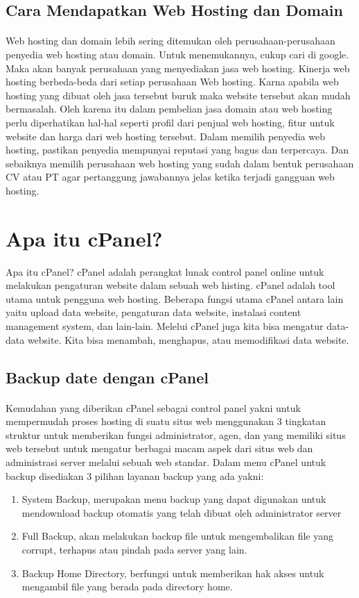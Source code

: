 \documentclass[12pt, a4paper]{article}
\begin{document}
\subsection{Cara Mendapatkan Web Hosting dan Domain}
\paragraph{}Web hosting dan domain lebih sering ditemukan oleh perusahaan-perusahaan penyedia web hosting atau domain. Untuk menemukannya, cukup cari di google. Maka akan banyak perusahaan yang menyediakan jasa web hosting. Kinerja web hosting berbeda-beda dari setiap perusahaan Web hosting. Karna apabila web hosting yang dibuat oleh jasa tersebut buruk maka website tersebut akan mudah bermasalah. Oleh karena itu dalam pembelian jasa domain atau web hosting perlu diperhatikan hal-hal seperti profil dari penjual web hosting, fitur untuk website dan harga dari web hosting tersebut. Dalam memilih penyedia web hosting, pastikan penyedia mempunyai reputasi yang bagus dan terpercaya. Dan sebaiknya memilih perusahaan web hosting yang sudah dalam bentuk perusahaan CV atau PT agar pertanggung jawabannya jelas ketika terjadi gangguan web hosting.
	
\section{Apa itu cPanel?}
Apa itu cPanel?
cPanel adalah perangkat lunak control panel online untuk melakukan pengaturan website dalam sebuah web histing. cPanel adalah tool utama untuk pengguna web hosting. 
Beberapa fungsi utama cPanel antara lain yaitu upload data website, pengaturan data website, instalasi content management system, dan lain-lain. Melelui cPanel juga kita bisa mengatur data-data website. Kita bisa menambah, menghapus, atau memodifikasi data website.

\subsection{Backup date dengan cPanel}
\paragraph{}Kemudahan yang diberikan cPanel sebagai control panel yakni untuk mempermudah proses hosting di suatu situs web menggunakan 3 tingkatan struktur untuk memberikan fungsi administrator, agen, dan yang memiliki situs web tersebut untuk mengatur berbagai macam aspek dari situs web dan administrasi server melalui sebuah web standar. Dalam menu cPanel untuk backup disediakan 3 pilihan layanan backup yang ada yakni:
\begin{enumerate}
\item System Backup, merupakan menu backup yang dapat digunakan untuk mendownload backup otomatis yang telah dibuat oleh administrator server
\item Full Backup, akan melakukan backup file untuk mengembalikan file yang corrupt, terhapus atau pindah pada server yang lain.
\item Backup Home Directory, berfungsi untuk memberikan hak akses untuk mengambil file yang berada pada directory home.
\end{enumerate}
\end{document}
